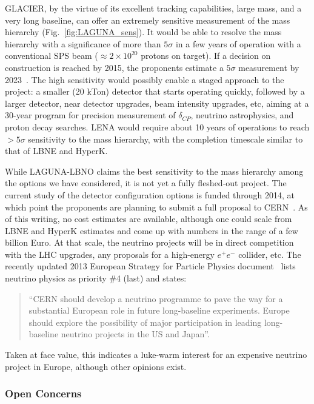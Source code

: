 GLACIER, by the virtue of its excellent tracking capabilities, large
mass, and a very long baseline, can offer an extremely sensitive measurement 
of the mass hierarchy (Fig.~\ref{fig:LAGUNA_sens}). It would be able
to resolve the mass 
hierarchy with a significance of more than $5\sigma$
 in a few years of operation with a
conventional SPS beam ($\approx 2\times10^{20}$ protons on target). If
a decision on construction is reached by 
2015, the proponents estimate a $5\sigma$ measurement by
2023~\cite{nonus:EuroNuStrategy,nonus:LBNO_LOI}. The high sensitivity
would possibly enable a staged 
approach to the project: a smaller (20 kTon) detector that starts operating
quickly, followed by a larger detector, near detector upgrades, beam
intensity upgrades, etc, aiming at a 30-year program for precision
measurement of $\delta_{CP}$, neutrino astrophysics, and proton
decay searches.  
LENA would require about 10 years of operations to reach $>5\sigma$
sensitivity to the mass hierarchy, with the completion timescale similar
to that of LBNE and HyperK. 

While LAGUNA-LBNO claims the best sensitivity to the mass hierarchy
among the options we have considered, it is not yet a fully
fleshed-out project. The current study of the detector configuration
options is funded through 2014, at which point the proponents are
planning to submit a full proposal to
CERN~\cite{nonus:LAGUNA,nonus:EuroNuStrategy}. As of 
this writing, no cost estimates are available, although one could
scale from LBNE and HyperK estimates and come up with numbers in the range of a
few billion Euro. At that scale, the neutrino projects will be
in direct competition with the LHC upgrades, any proposals for a
high-energy $e^+e^-$ collider, etc. The recently updated 2013 European
Strategy for Particle Physics document~\cite{nonus:EuroNuStrategy}
lists neutrino physics as priority \#4 (last) and states: 
\begin{quotation} ``CERN should 
develop a neutrino programme to pave the way for 
a substantial European role in future long-baseline 
experiments. Europe should explore the possibility 
of major participation in leading long-baseline 
neutrino projects in the US and Japan''.\end{quotation} Taken at face value, this
indicates a luke-warm interest for an expensive neutrino project in
Europe, although other opinions exist. 

\subsubsection{Open Concerns}

